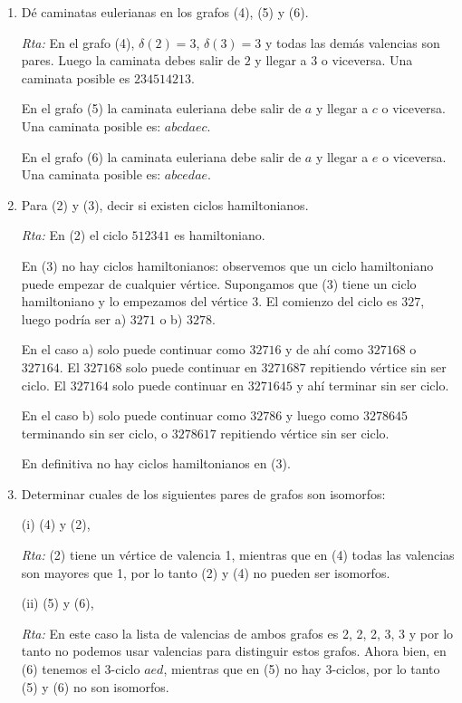 \documentclass[a4paper,12pt,twoside,spanish,reqno]{amsbook}
\numberwithin{equation}{section}
\newcommand{\rta}{\noindent\textit{Rta: }}
\begin{document}
\begin{enumerate}
\begin{enumerate}
        
        \item Dé caminatas eulerianas en los grafos (4), (5) y (6).
        
        \rta  En  el  grafo (4), $\delta(2)=3$, $\delta(3)=3$ y todas las demás valencias son pares. Luego la caminata debes salir de $2$ y llegar a $3$ o viceversa. Una caminata posible es $234514213$.    
        
        En  el grafo (5) la caminata euleriana debe salir de $a$ y llegar a $c$ o viceversa. Una caminata posible es: $abcdaec$.
        
        En  el grafo (6) la caminata euleriana debe salir de $a$ y llegar a $e$ o viceversa. Una caminata posible es: $abcedae$.
        
        \item Para (2) y (3), decir si existen ciclos hamiltonianos.
        
        \rta En (2) el  ciclo $512341$ es hamiltoniano. 
        
        
        En (3) no hay ciclos hamiltonianos: observemos  que un ciclo hamiltoniano puede empezar de cualquier vértice. Supongamos que (3) tiene un ciclo hamiltoniano y lo empezamos del vértice $3$. El comienzo del ciclo es $327$, luego podría ser  a) $3271$ o  b) $3278$. 
        
        En  el caso a) solo  puede continuar como $32716$ y  de ahí  como $327168$ o $327164$. El $327168$ solo puede continuar en $3271687$ repitiendo vértice sin ser ciclo. El  $327164$ solo puede continuar en $3271645$ y ahí terminar  sin ser ciclo. 
        
        En  el caso b) solo puede continuar como $32786$ y luego  como $3278645$ terminando sin ser ciclo,  o $3278617$ repitiendo vértice sin ser ciclo. 
        
        En  definitiva no hay ciclos hamiltonianos en (3). 
        
        \item Determinar cuales de los siguientes pares de grafos son isomorfos:
        
        (i) (4) y (2),\quad 
        
        \rta (2) tiene un vértice de  valencia 1, mientras que en  (4) todas las valencias son mayores que 1, por lo tanto (2) y (4) no pueden ser isomorfos. 
        
        (ii) (5) y (6), \quad 
        
        \rta En este caso  la lista de valencias de ambos grafos es 2, 2, 2, 3, 3 y por lo tanto no podemos usar valencias para distinguir estos grafos. Ahora bien, en (6) tenemos el 3-ciclo $aed$, mientras que en (5) no hay 3-ciclos, por lo tanto (5) y (6) no son isomorfos.   
        

\end{enumerate}
\end{enumerate}
\end{document}
